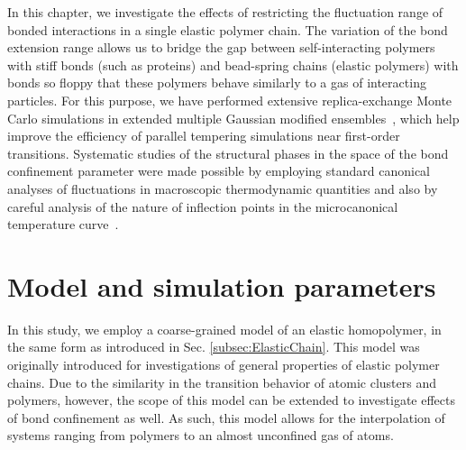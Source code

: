 \documentclass[12pt]{report}
\begin{document}
In this chapter, we investigate the effects of restricting the fluctuation range of bonded interactions in a single elastic polymer chain. The variation of the bond extension range allows us to bridge the gap between self-interacting polymers with stiff bonds (such as proteins) and bead-spring chains (elastic polymers) with bonds so floppy that these polymers behave similarly to a gas of interacting particles. For this purpose, we have performed extensive replica-exchange Monte Carlo simulations in extended multiple Gaussian modified ensembles~\cite{Neuhaus2006}, which help improve the efficiency of parallel tempering simulations near first-order transitions. Systematic studies of the structural phases in the space of the bond confinement parameter were made possible by employing standard canonical analyses of fluctuations in macroscopic thermodynamic quantities and also by careful analysis of the nature of inflection points in the microcanonical temperature curve~\cite{Bachmann2014,Schnabel2011}.

\section{Model and simulation parameters}
In this study, we employ a coarse-grained model of an elastic homopolymer, in the same form as introduced in Sec.\,\,\ref{subsec:ElasticChain}. This model was originally introduced for investigations of general properties of elastic polymer chains. Due to the similarity in the transition behavior of atomic clusters and polymers, however, the scope of this model can be extended to investigate effects of bond confinement as well. As such, this model allows for the interpolation of systems ranging from polymers to an almost unconfined gas of atoms.
\end{document}
